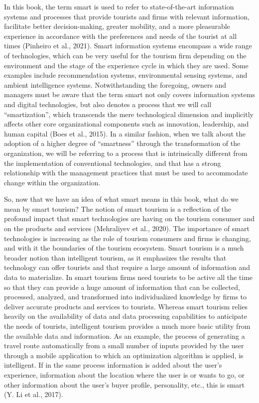 \documentclass[
  letterpaper,
  DIV=11,
  numbers=noendperiod]{scrreprt}
\begin{document}
In this book, the term smart is used to refer to state-of-the-art
information systems and processes that provide tourists and firms with
relevant information, facilitate better decision-making, greater
mobility, and a more pleasurable experience in accordance with the
preferences and needs of the tourist at all times (Pinheiro et al.,
2021). Smart information systems encompass a wide range of technologies,
which can be very useful for the tourism firm depending on the
environment and the stage of the experience cycle in which they are
used. Some examples include recommendation systems, environmental
sensing systems, and ambient intelligence systems. Notwithstanding the
foregoing, owners and managers must be aware that the term smart not
only covers information systems and digital technologies, but also
denotes a process that we will call ``smartization'', which transcends
the mere technological dimension and implicitly affects other core
organizational components such as innovation, leadership, and human
capital (Boes et al., 2015). In a similar fashion, when we talk about
the adoption of a higher degree of ``smartness'' through the
transformation of the organization, we will be referring to a process
that is intrinsically different from the implementation of conventional
technologies, and that has a strong relationship with the management
practices that must be used to accommodate change within the
organization.

So, now that we have an idea of what smart means in this book, what do
we mean by smart tourism? The notion of smart tourism is a reflection of
the profound impact that smart technologies are having on the tourism
consumer and on the products and services (Mehraliyev et al., 2020). The
importance of smart technologies is increasing as the role of tourism
consumers and firms is changing, and with it the boundaries of the
tourism ecosystem. Smart tourism is a much broader notion than
intelligent tourism, as it emphasizes the results that technology can
offer tourists and that require a large amount of information and data
to materialize. In smart tourism firms need tourists to be active all
the time so that they can provide a huge amount of information that can
be collected, processed, analyzed, and transformed into individualized
knowledge by firms to deliver accurate products and services to
tourists. Whereas smart tourism relies heavily on the availability of
data and data processing capabilities to anticipate the needs of
tourists, intelligent tourism provides a much more basic utility from
the available data and information. As an example, the process of
generating a travel route automatically from a small number of inputs
provided by the user through a mobile application to which an
optimization algorithm is applied, is intelligent. If in the same
process information is added about the user's experience, information
about the location where the user is or wants to go, or other
information about the user's buyer profile, personality, etc., this is
smart (Y. Li et al., 2017).
\end{document}
